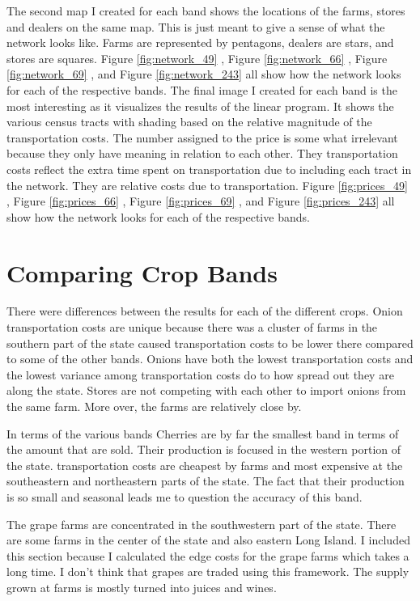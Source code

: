 \documentclass{report}
\begin{document}
The second map I created for each band shows the locations of the farms, stores and dealers on the same map. This is just meant to give a sense of what the network looks like. Farms are represented by pentagons, dealers are stars, and stores are squares. Figure \ref{fig:network_49} , Figure \ref{fig:network_66} , Figure \ref{fig:network_69} , and Figure \ref{fig:network_243} all show how the network looks for each of the respective bands. The final image I created for each band is the most interesting as it  visualizes the results of the linear program. It shows the various census tracts with shading based on the relative magnitude of the transportation costs. The  number assigned to the price is some what irrelevant because they only have meaning in relation to each other. They transportation costs reflect the extra time spent on transportation due to including each tract in the network. They are  relative costs due to transportation. Figure \ref{fig:prices_49} , Figure \ref{fig:prices_66} , Figure \ref{fig:prices_69} , and Figure \ref{fig:prices_243} all show how the network looks for each of the respective bands.

\section{Comparing Crop Bands}

There were differences between the results for each of the different crops. Onion transportation costs are unique because there was a cluster of farms in the southern part of the state caused transportation costs to be lower there compared to some of the other bands. Onions have both the lowest transportation costs and the lowest variance among transportation costs do to how spread out they are along the state. Stores are not competing with each other to import onions from the same farm. More over, the farms are relatively close by.

In terms of the various bands Cherries are by far the smallest band in terms of the amount that are sold. Their production is focused in the western portion of the state. transportation costs are cheapest by farms and most expensive at the southeastern and northeastern parts of the state. The fact that their production is so small and seasonal leads me to question the accuracy of this band. 

The grape farms are concentrated in the southwestern part of the state. There are some farms in the center of the state and also eastern Long Island. I included this section because I calculated the edge costs for the grape farms which takes a long time. I don't think that grapes  are traded using this framework. The supply grown at farms is mostly turned into juices and wines.
\end{document}
